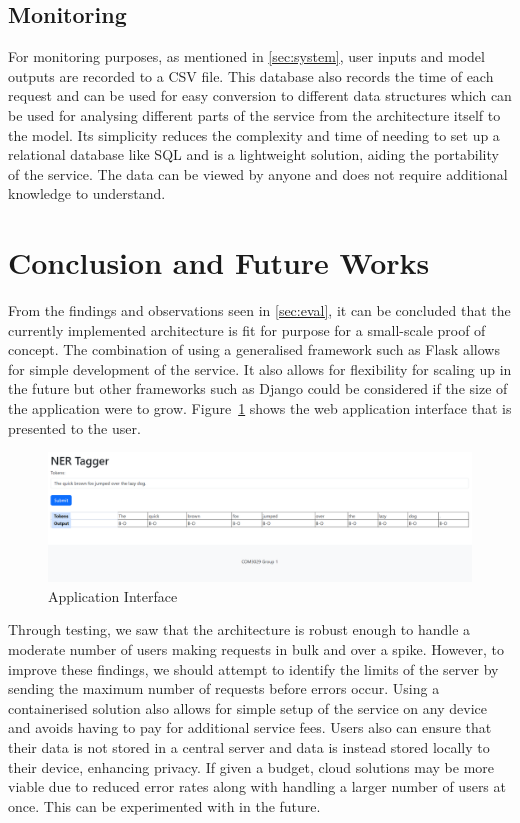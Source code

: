 \documentclass{surreydissertation}
\begin{document}
\subsection{Monitoring}
For monitoring purposes, as mentioned
in \autoref{sec:system},
user inputs and model outputs are recorded to a CSV file. This database also records the time of each request and can be used for easy conversion to different data structures which can be used for analysing different parts of the service from the architecture itself to the model. Its simplicity reduces the complexity and time of needing to set up a relational database like SQL and is a lightweight solution, aiding the portability of the service. The data can be viewed by anyone and does not require additional knowledge to understand.

\section{Conclusion and Future Works}
From the findings and observations seen
in \autoref{sec:eval}, it can be concluded that the currently implemented architecture is fit for purpose for a small-scale proof of concept. The combination of using a generalised framework such as Flask allows for simple development of the service. It also allows for flexibility for scaling up in the future but other frameworks such as Django could be considered if the size of the application were to grow. Figure~\ref{fig:interface} shows the web application interface that is presented to the user.

\begin{figure}[H]
    \centering
    \includegraphics[width=1.0\linewidth]{Figures/frontend.png}
    \caption{Application Interface}
    \label{fig:interface}
 \end{figure}

Through testing, we saw that the architecture is robust enough to handle a moderate number of users making requests in bulk and over a spike. However, to improve these findings, we should attempt to identify the limits of the server by sending the maximum number of requests before errors occur. Using a containerised solution also allows for simple setup of the service on any device and avoids having to pay for additional service fees. Users also can ensure that their data is not stored in a central server and data is instead stored locally to their device, enhancing privacy. If given a budget, cloud solutions may be more viable due to reduced error rates along with handling a larger number of users at once. This can be experimented with in the future.

\appendix
%
%



\end{document}

